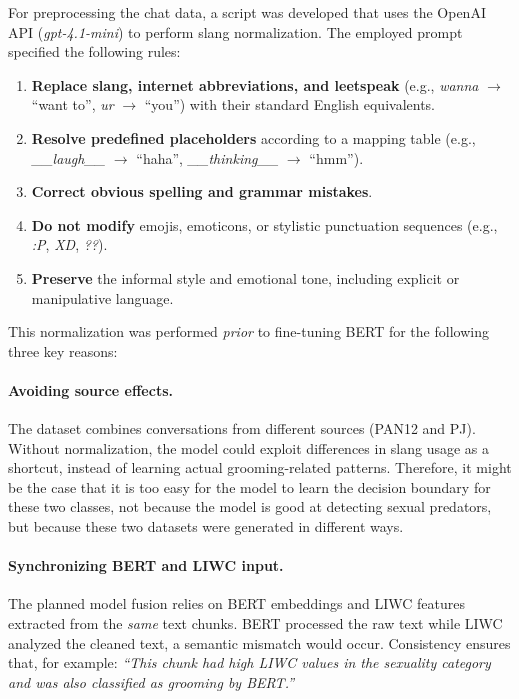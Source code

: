 For preprocessing the chat data, a script was developed that uses the OpenAI API (\textit{gpt-4.1-mini}) to perform slang normalization. The employed prompt specified the following rules:
\begin{enumerate}
    \item \textbf{Replace slang, internet abbreviations, and leetspeak} (e.g., \textit{wanna} $\rightarrow$ ``want to'', \textit{ur} $\rightarrow$ ``you'') with their standard English equivalents.
    \item \textbf{Resolve predefined placeholders} according to a mapping table (e.g., \textit{\_\_laugh\_\_} $\rightarrow$ ``haha'', \textit{\_\_thinking\_\_} $\rightarrow$ ``hmm'').
    \item \textbf{Correct obvious spelling and grammar mistakes}.
    \item \textbf{Do not modify} emojis, emoticons, or stylistic punctuation sequences (e.g., \textit{:P}, \textit{XD}, \textit{??}).
    \item \textbf{Preserve} the informal style and emotional tone, including explicit or manipulative language.
\end{enumerate}

This normalization was performed \emph{prior} to fine-tuning BERT for the following three key reasons:

\paragraph{Avoiding source effects.}  
The dataset combines conversations from different sources (PAN12 and PJ). Without normalization, the model could exploit differences in slang usage as a shortcut, instead of learning actual grooming-related patterns. Therefore, it might be the case that it is too easy for the model to learn the decision boundary for these two classes, not because the model is good at detecting sexual predators, but because these two datasets were generated in different ways. \parencite{schlaepfer2022online}

\paragraph{Synchronizing BERT and LIWC input.}  
The planned model fusion relies on BERT embeddings and LIWC features extracted from the \emph{same} text chunks. BERT processed the raw text while LIWC analyzed the cleaned text, a semantic mismatch would occur. \cite{he2021deberta} Consistency ensures that, for example:  
\textit{``This chunk had high LIWC values in the sexuality category and was also classified as grooming by BERT.''}
 
